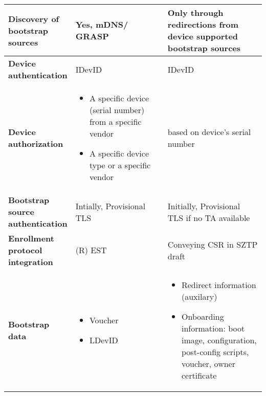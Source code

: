 \begin{longtable}{|p{0.23\linewidth}|p{0.372\linewidth}|p{0.393\linewidth}|}
		\hline
		\cellcolor[rgb]{ .745,  .804,  .843} \textbf{Discovery of bootstrap sources} &  Yes, mDNS/ GRASP &  Only through redirections from device supported bootstrap sources \\

		\hline
		\cellcolor[rgb]{ .745,  .804,  .843} \textbf{Device authentication} &  IDevID &  IDevID \\

		\hline
		\cellcolor[rgb]{ .745,  .804,  .843} \textbf{Device authorization} &   
			\begin{itemize}[leftmargin=*, topsep=0pt, noitemsep]
			\item
				A specific device (serial number) from a specific vendor
			\item
				A specific device type or a specific vendor
			\end{itemize}
		
		&  based on device's serial number \\

		\hline
		\cellcolor[rgb]{ .745,  .804,  .843} \textbf{Bootstrap source authentication} &  Intially, Provisional TLS &  Initially, Provisional TLS if no TA available \\

		\hline
		\cellcolor[rgb]{ .745,  .804,  .843} \textbf{Enrollment protocol integration} &  (R) EST &  Conveying CSR in SZTP draft \cite{sztp-csr-draft} \\

		\hline
		\cellcolor[rgb]{ .745,  .804,  .843} \textbf{Bootstrap data} &  
		\begin{itemize}[leftmargin=*, topsep=0pt, noitemsep]
			\item
				Voucher
			\item
				LDevID
		\end{itemize}
		 &  
			\begin{itemize}[leftmargin=*, topsep=0pt, noitemsep]
			\item
			Redirect information (auxilary)
			\item
			Onboarding information: boot image, configuration, post-config scripts, voucher, owner certificate
		\end{itemize}
		 \\


\end{longtable}
